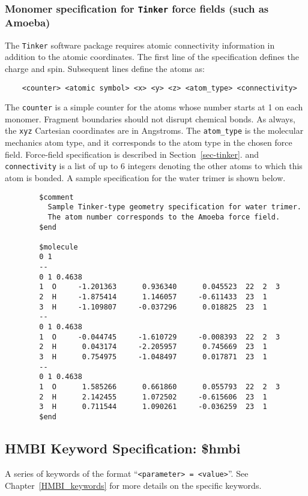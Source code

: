 \documentclass[11pt,letterpaper]{article}
\begin{document}
\begin{spacing}{1.0}
\subsubsection{Monomer specification for {\tt Tinker} force fields (such as Amoeba)}
The {\tt Tinker} software package requires atomic connectivity
information in addition to the atomic coordinates.  The first line of the
specification defines the charge and spin.  Subsequent lines define the
atoms as:
\begin{verbatim}
    <counter> <atomic symbol> <x> <y> <z> <atom_type> <connectivity>
\end{verbatim}
The {\tt counter} is a simple counter for the atoms whose number
starts at 1 on each monomer.  Fragment boundaries should not disrupt
chemical bonds.  As always, the {\tt xyz} Cartesian coordinates are in
Angstroms.  The {\tt atom\_type} is the molecular mechanics atom type,
and it corresponds to the atom type in the chosen force field.  Force-field
specification is described in Section~\ref{sec-tinker}.
and {\tt connectivity} is a list of up to 6 integers denoting the
other atoms to which this atom is bonded.  A sample specification for
the water trimer is shown below.

\vspace{5mm}
\hrulefill
\begin{verbatim}
        $comment
          Sample Tinker-type geometry specification for water trimer.
          The atom number corresponds to the Amoeba force field.
        $end

        $molecule
        0 1
        --
        0 1 0.4638
        1  O     -1.201363      0.936340      0.045523  22  2  3
        2  H     -1.875414      1.146057     -0.611433  23  1
        3  H     -1.109807     -0.037296      0.018825  23  1
        --
        0 1 0.4638
        1  O     -0.044745     -1.610729     -0.008393  22  2  3 
        2  H      0.043174     -2.205957      0.745669  23  1
        3  H      0.754975     -1.048497      0.017871  23  1 
        --
        0 1 0.4638
        1  O      1.585266      0.661860      0.055793  22  2  3
        2  H      2.142455      1.072502     -0.615606  23  1
        3  H      0.711544      1.090261     -0.036259  23  1
        $end
\end{verbatim}
\hrulefill
\vspace{5mm}


\subsection{HMBI Keyword Specification: \$hmbi}
A series of keywords of the format ``{\tt <parameter> = <value>}''.
See Chapter~\ref{HMBI_keywords} for more details on the specific
keywords.


\end{spacing}
\end{document}
